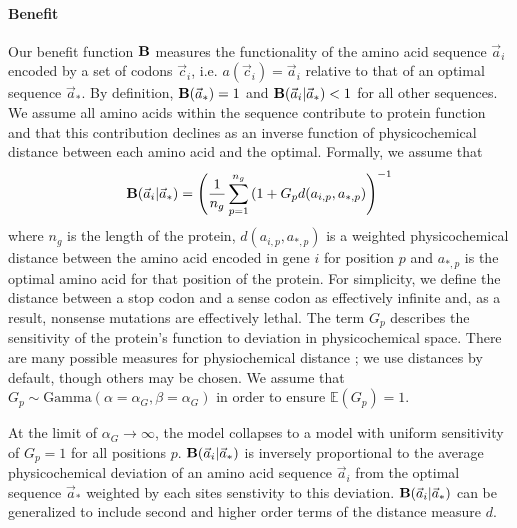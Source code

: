 \documentclass{article}
\newcommand{\EE}{\mathbb{E}} %
\newcommand{\Funcaoptvec}{\ensuremath{\Func(\aoptvec)}\xspace}
\newcommand{\Funcaveci}{\ensuremath{\Func(\aveci|\aoptvec)}\xspace}
\newcommand{\Func}{\ensuremath{\text{\textbf{B}}}\xspace}
\newcommand{\aip}{\ensuremath{a_{i,p}}\xspace}
\newcommand{\alphag}{\ensuremath{\alpha_G}\xspace}
\newcommand{\aoptp}{\ensuremath{a_{*,p}}\xspace}
\newcommand{\aoptvec}{\ensuremath{\Vec{a}_*}\xspace}
\newcommand{\aveci}{\ensuremath{\Vec{a}_i}\xspace}
\newcommand{\cveci}{\ensuremath{\cvec_i}\xspace}
\newcommand{\cvec}{\ensuremath{\Vec{c}}\xspace}
\renewcommand{\ng}{\ensuremath{{n_g}}\xspace}
\newcommand{\gp}{\ensuremath{{G_p}}\xspace}
\begin{document}
\paragraph*{Benefit}
Our benefit function \Func measures the functionality of the amino acid sequence \aveci encoded by a set of codons \cveci, i.e. $a(\cveci) = \aveci$ relative to that of an optimal sequence $\aoptvec$.
By definition, $\Funcaoptvec = 1$ and $\Funcaveci < 1$ for all other sequences.
We assume all amino acids within the sequence contribute to protein function and that this contribution declines as an inverse function of physicochemical distance between each amino acid and the optimal.
Formally, we assume that
\begin{equation}
\Funcaveci = \left(\frac{1}{\ng} \sum_{p=1}^\ng \left(1 + \gp d(\aip, \aoptp\right)\right)^{-1}
\end{equation}
where $\ng$ is the length of the protein, $d(\aip, \aoptp)$ is a weighted physicochemical distance between the amino acid encoded in gene $i$ for position $p$ and $\aoptp$ is the optimal amino acid for that position of the protein.
For simplicity, we define the distance between a stop codon and a sense codon as effectively infinite and, as a result, nonsense mutations are effectively lethal. %
The term \gp describes the sensitivity of the protein's function to deviation in physicochemical space.
There are many possible measures for physiochemical distance \citep{}; we use \cite{Grantham1974} distances by default, though others may be chosen. 
We assume that $\gp \sim \text{Gamma}\left(\alpha = \alphag, \beta = \alphag\right)$ in order to ensure $\EE(\gp) = 1$.

At the limit of $\alphag \rightarrow \infty$, the model collapses to a model with uniform sensitivity of $\gp = 1$ for all positions $p$.
\Funcaveci is inversely proportional to the average physicochemical deviation of an amino acid sequence \aveci from the optimal sequence \aoptvec weighted by each sites senstivity to this deviation.
\Funcaveci can be generalized to include second and higher order terms of the distance measure $d$.
\end{document}
